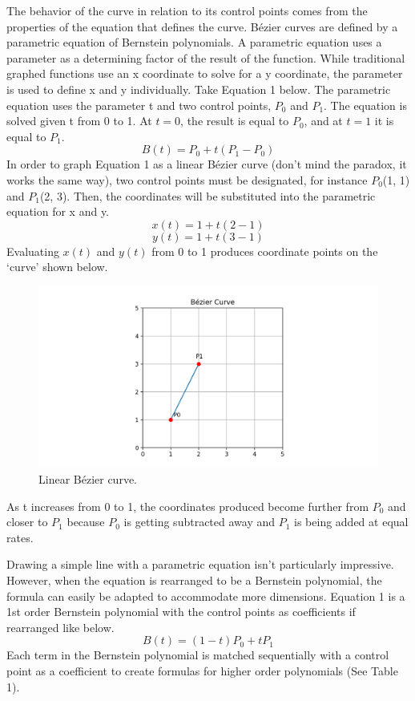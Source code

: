 \documentclass[12pt,letterpaper]{article}
\begin{document}
The behavior of the curve in relation to its control points comes from the properties of the equation that defines the curve. B\'ezier curves are defined by a parametric equation of Bernstein polynomials. A parametric equation uses a parameter as a determining factor of the result of the function. While traditional graphed functions use an x coordinate to solve for a y coordinate, the parameter is used to define x and y individually. 
Take Equation 1 below. The parametric equation uses the parameter t and two control points, $P_0$ and $P_1$. The equation is solved given t from 0 to 1. At $t=0$, the result is equal to $P_0$, and at $t=1$ it is equal to $P_1$.
$$B(t) = P_0 + t(P_1 - P_0)$$
In order to graph Equation 1 as a linear B\'ezier curve (don’t mind the paradox, it works the same way), two control points must be designated, for instance $P_0$(1, 1) and $P_1$(2, 3). Then, the coordinates will be substituted into the parametric equation for x and y.
$$x(t) = 1 + t(2-1)$$
$$y(t) = 1 + t(3-1)$$
Evaluating $x(t)$ and $y(t)$ from 0 to 1 produces coordinate points on the ‘curve’ shown below. 
\begin{figure}[H]
\includegraphics[width=15cm]{Figure_3}
\centering
\caption{Linear B\'ezier curve.}
\end{figure}
As t increases from 0 to 1, the coordinates produced become further from $P_0$ and closer to $P_1$ because $P_0$ is getting subtracted away and $P_1$ is being added at equal rates. 

Drawing a simple line with a parametric equation isn’t particularly impressive. However, when the equation is rearranged to be a Bernstein polynomial, the formula can easily be adapted to accommodate more dimensions. Equation 1 is a 1st order Bernstein polynomial with the control points as coefficients if rearranged like below.
$$B(t) = (1-t)P_0 + t P_1$$
Each term in the Bernstein polynomial is matched sequentially with a control point as a coefficient to create formulas for higher order polynomials (See Table 1).
\end{document}
